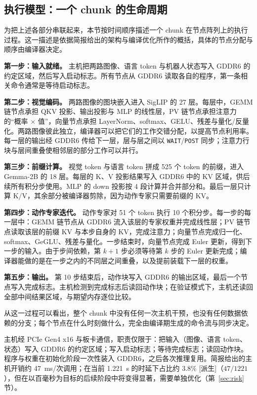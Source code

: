 \documentclass[a4paper,10.5pt]{ctexart}
\newcommand{\tD}{\textsf{[派生]}}           %
\begin{document}
\subsection{执行模型：一个 chunk 的生命周期}\label{sec:exec}

为把上述各部分串联起来，本节按时间顺序描述一个 chunk 在节点阵列上的执行过程。这一描述是依据简报给出的架构与编译优化所作的概括，具体的节点分配与顺序由编译器决定。

\textbf{第一步：输入就绪。} 主机把两路图像、语言 token 与机器人状态写入 GDDR6 的约定区域，然后写入启动标志。所有节点从 GDDR6 读取各自的程序，第一条相关命令通常是等待启动标志。

\textbf{第二步：视觉编码。} 两路图像的图块嵌入进入 SigLIP 的 27 层。每层中，GEMM 链节点承担 QKV 投影、输出投影与 MLP 的线性层，PV 链节点承担注意力的“概率 $\times$ 值”，向量节点承担 LayerNorm、softmax、GELU、残差与量化/反量化。两路图像彼此独立，编译器可以把它们的工作交错分配，以提高节点利用率。每一层的输出经 GDDR6 传给下一层，层与层之间以 \texttt{WAIT}/\texttt{POST} 同步；注意力行块与层间重叠使相邻层的部分工作可以并行。

\textbf{第三步：前缀计算。} 视觉 token 与语言 token 拼成 525 个 token 的前缀，进入 Gemma-2B 的 18 层。每层的 K、V 投影结果写入 GDDR6 中的 KV 区域，供后续所有积分步使用。MLP 的 down 投影按 4 段计算并合并部分和。最后一层只计算 K/V，其余部分被编译器剪除，因为动作专家只需要前缀的 KV。

\textbf{第四步：动作专家迭代。} 动作专家对 51 个 token 执行 10 个积分步。每一步的每一层中：GEMM 链节点从 GDDR6 流入该层的专家权重并完成线性层；PV 链节点读取该层的前缀 KV 与本步自身的 KV，完成注意力；向量节点完成归一化、softmax、GeGLU、残差与量化。一步结束时，向量节点完成 Euler 更新，得到下一步的输入。由于步间依赖，第 $k+1$ 步必须等待第 $k$ 步的 Euler 更新完成；编译器能做的是在一步之内的不同层之间重叠，以及提前装载下一层的权重。

\textbf{第五步：输出。} 第 10 步结束后，动作块写入 GDDR6 的输出区域，最后一个节点写入完成标志。主机检测到完成标志后读回动作块；在验证模式下，主机还读回全部中间结果区域，与期望内存逐位比较。

从这一过程可以看出，整个 chunk 中没有任何一次主机干预，也没有任何数据依赖的分支；每个节点在什么时刻做什么，完全由编译期生成的命令流与同步决定。

主机经 PCIe Gen4 x16 与板卡通信，职责仅限于：把输入（图像、语言 token、状态）写入 GDDR6 的约定区域；写入启动标志；等待完成标志；读回动作块。程序与权重在初始化阶段一次性装入 GDDR6，之后各次推理复用。简报给出的主机开销约 47~ms/次调用；在当前 1.221~s 的时延下占比约 3.8\% \tD（$47/1221$），但在以百毫秒为目标的后续阶段中将变得显著，需要单独优化（第~\ref{sec:risk} 节）。
\end{document}
